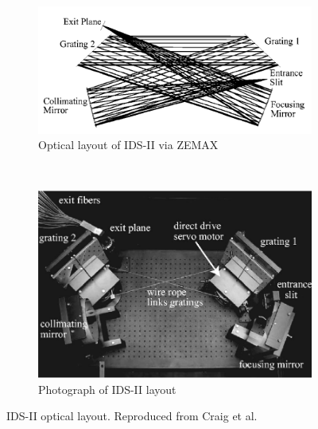 \begin{figure}[!htb]
	\centering
    \begin{subfigure}[t]{0.5\textwidth}
        \centering
        \includegraphics[width = \textwidth]{implementation/diagnostics/idsii_trace.png}
        \caption{Optical layout of IDS-II via ZEMAX}
    \end{subfigure}%
    ~ 
    \begin{subfigure}[t]{0.5\textwidth}
        \centering
        \includegraphics[width = \textwidth]{implementation/diagnostics/idsii_photo.png}
        \caption{Photograph of IDS-II layout}
    \end{subfigure}
	\caption[IDS-II optical layout]{IDS-II optical layout. Reproduced from Craig et al. \cite{Craig}}
	\label{fig:IDS-II}
\end{figure}

